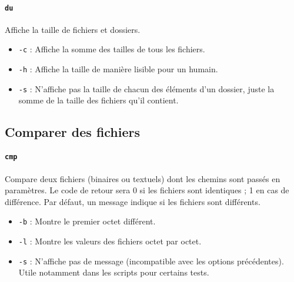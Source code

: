 \paragraph{\texttt{du}} 
Affiche la taille de fichiers et dossiers.
\begin{itemize}
    \item \texttt{-c} : Affiche la somme des tailles de tous les fichiers.
    \item \texttt{-h} : Affiche la taille de manière lisible pour un humain.
    \item \texttt{-s} : N'affiche pas la taille de chacun des éléments d'un dossier, juste la somme de la taille des fichiers qu'il contient.
\end{itemize}

\subsection{Comparer des fichiers}

\paragraph{\texttt{cmp}} 
Compare deux fichiers (binaires ou textuels) dont les chemins sont passés en paramètres. Le code de retour sera 0 si les fichiers sont identiques ; 1 en cas de différence. Par défaut, un message indique si les fichiers sont différents.
\begin{itemize}
    \item \texttt{-b} : Montre le premier octet différent.
    \item \texttt{-l} : Montre les valeurs des fichiers octet par octet.
    \item \texttt{-s} : N'affiche pas de message (incompatible avec les options précédentes). Utile notamment dans les scripts pour certains tests.
\end{itemize}

